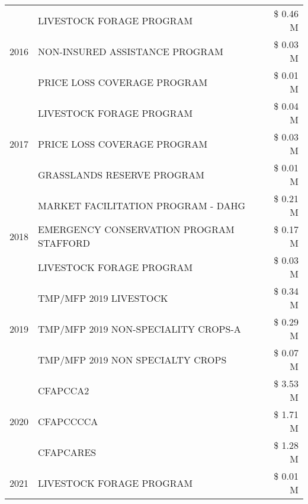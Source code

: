 \begin{tabular}{llr}
\cline{1-3}
\multirow[t]{3}{*}{2016} & LIVESTOCK FORAGE PROGRAM & \$ 0.46 M \\
 & NON-INSURED ASSISTANCE PROGRAM & \$ 0.03 M \\
 & PRICE LOSS COVERAGE PROGRAM & \$ 0.01 M \\
\cline{1-3}
\multirow[t]{3}{*}{2017} & LIVESTOCK FORAGE PROGRAM & \$ 0.04 M \\
 & PRICE LOSS COVERAGE PROGRAM & \$ 0.03 M \\
 & GRASSLANDS RESERVE PROGRAM & \$ 0.01 M \\
\cline{1-3}
\multirow[t]{3}{*}{2018} & MARKET FACILITATION PROGRAM - DAHG & \$ 0.21 M \\
 & EMERGENCY CONSERVATION PROGRAM STAFFORD & \$ 0.17 M \\
 & LIVESTOCK FORAGE PROGRAM & \$ 0.03 M \\
\cline{1-3}
\multirow[t]{3}{*}{2019} & TMP/MFP 2019 LIVESTOCK & \$ 0.34 M \\
 & TMP/MFP 2019 NON-SPECIALITY CROPS-A & \$ 0.29 M \\
 & TMP/MFP 2019 NON SPECIALTY CROPS & \$ 0.07 M \\
\cline{1-3}
\multirow[t]{3}{*}{2020} & CFAPCCA2 & \$ 3.53 M \\
 & CFAPCCCCA & \$ 1.71 M \\
 & CFAPCARES & \$ 1.28 M \\
\cline{1-3}
2021 & LIVESTOCK FORAGE PROGRAM & \$ 0.01 M \\
\cline{1-3}
\bottomrule
\end{tabular}
